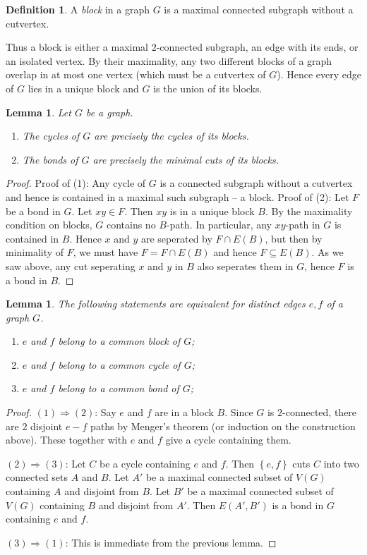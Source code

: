 \documentclass[12pt]{article}
\theoremstyle{plain}
\newtheorem{lem}[thm]{Lemma}
\theoremstyle{definition}
\newtheorem{defn}{Definition}[section]
\theoremstyle{remark}
\newcommand{\set}[1]{\left\{ #1 \right\}}
\begin{document}
\begin{defn}
A \emph{block} in a graph $G$ is a maximal connected subgraph without a cutvertex.  
\end{defn}

Thus a block is either a maximal $2$-connected subgraph, an edge with its ends, or an isolated vertex.  By their maximality, any two different blocks of a graph overlap in at most one vertex (which must be a cutvertex of $G$).  Hence every edge of $G$ lies in a unique block and $G$ is the union of its blocks.

\begin{lem}
Let $G$ be a graph.
\begin{enumerate}
\item The cycles of $G$ are precisely the cycles of its blocks.
\item The bonds of $G$ are precisely the minimal cuts of its blocks.
\end{enumerate}
\end{lem}
\begin{proof}
Proof of (1): Any cycle of $G$ is a connected subgraph without a cutvertex and hence is contained in a maximal such subgraph -- a block.
Proof of (2): Let $F$ be a bond in $G$.  Let $xy \in F$. Then $xy$ is in a unique block $B$.  By the maximality condition on blocks, $G$ contains no $B$-path.  In particular, any $xy$-path in $G$ is contained in $B$.  Hence $x$ and $y$ are seperated by $F \cap E(B)$, but then by minimality of $F$, we must have $F = F \cap E(B)$ and hence $F \subseteq E(B)$. As we saw above, any cut seperating $x$ and $y$ in $B$ also seperates them in $G$, hence $F$ is a bond in $B$.
\end{proof}

\begin{lem}
The following statements are equivalent for distinct edges $e, f$ of a graph $G$.
\begin{enumerate}
\item $e$ and $f$ belong to a common block of $G$;
\item $e$ and $f$ belong to a common cycle of $G$;
\item $e$ and $f$ belong to a common bond of $G$;
\end{enumerate}
\end{lem}
\begin{proof}
$(1) \Rightarrow (2)$: Say $e$ and $f$ are in a block $B$. Since $G$ is $2$-connected, there are $2$ disjoint $e-f$ paths by Menger's theorem (or induction on the construction above).  These together with $e$ and $f$ give a cycle containing them.

$(2) \Rightarrow (3)$: Let $C$ be a cycle containing $e$ and $f$.  Then $\set{e,f}$ cuts $C$ into two connected sets $A$ and $B$.  Let $A'$ be a maximal connected subset of $V(G)$ containing $A$ and disjoint from $B$.  Let $B'$ be a maximal connected subset of $V(G)$ containing $B$ and disjoint from $A'$.  Then $E(A', B')$ is a bond in $G$ containing $e$ and $f$.

$(3) \Rightarrow (1)$: This is immediate from the previous lemma.
\end{proof}
\end{document}
